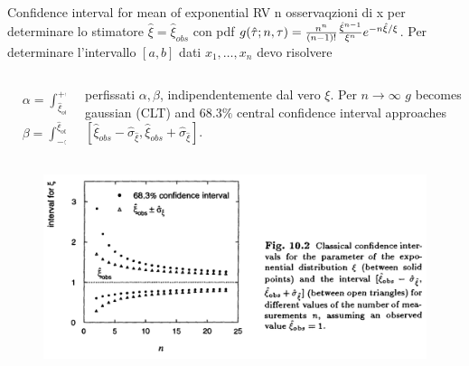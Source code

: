 \documentclass[asd-beamer.tex]{subfiles}%
\begin{document}
\begin{frame}{Confidence interval for mean of exponential RV}
n osservaqzioni di x per determinare lo stimatore $\hat{\xi}=\hat{\xi}_{obs}$ con pdf $g(\hat{\tau};n,\tau)=\frac{n^n}{(n-1)!}\frac{\hat{\xi}^{n-1}}{\xi^n}e^{-n\hat{\xi}/\xi}$. Per determinare l'intervallo $[a,b]$ dati $x_1,\ldots,x_n$ devo risolvere
\begin{columns}[T]\begin{column}{0.4\textwidth}
\begin{align*}
&\alpha=\int_{\hat{\xi}_{obs}}^{+\infty}g(\hat{\xi};a)\,d\hat{\xi}\\
&\beta=\int_{-\infty}^{\hat{\xi}_{obs}}g(\hat{\xi};b)\,d\hat{\xi}
\end{align*}
\end{column}
\begin{column}{0.6\textwidth}
perfissati $\alpha,\beta$, indipendentemente dal vero $\xi$. Per $n\to\infty$ $g$ becomes gaussian (CLT) and $68.3\%$ central confidence interval approaches $[\hat{\xi}_{obs}-\hat{\sigma}_{\hat{\xi}},\hat{\xi}_{obs}+\hat{\sigma}_{\hat{\xi}}]$.
\end{column}
\end{columns}
\begin{figure}[!ht]\includegraphics[trim={0cm 0cm 0 0},clip, keepaspectratio,height=0.4\textheight]{figures/cowan/estimators/intestclt}\label{fig:intestclt}\end{figure}
\end{frame}
\end{document}
